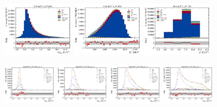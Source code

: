 \begin{figure}[!htb]
    \centering
    \includegraphics[width=0.32\textwidth]{./figs-fit-fit-results/sig-fit/stacked/fit_result-stacked-D0-iso-mmiss2.pdf}
    \includegraphics[width=0.32\textwidth]{./figs-fit-fit-results/sig-fit/stacked/fit_result-stacked-D0-iso-el.pdf}
    \includegraphics[width=0.32\textwidth]{./figs-fit-fit-results/sig-fit/stacked/fit_result-stacked-D0-iso-q2.pdf}

    \includegraphics[width=0.24\textwidth]{./figs-fit-fit-results/sig-fit/lines_q2_slices/fit_result-lines_q2_idx1-D0-iso-mmiss2.pdf}
    \includegraphics[width=0.24\textwidth]{./figs-fit-fit-results/sig-fit/lines_q2_slices/fit_result-lines_q2_idx2-D0-iso-mmiss2.pdf}
    \includegraphics[width=0.24\textwidth]{./figs-fit-fit-results/sig-fit/lines_q2_slices/fit_result-lines_q2_idx3-D0-iso-mmiss2.pdf}
    \includegraphics[width=0.24\textwidth]{./figs-fit-fit-results/sig-fit/lines_q2_slices/fit_result-lines_q2_idx4-D0-iso-mmiss2.pdf}


\end{figure}
